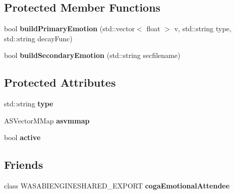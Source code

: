 \subsection*{\-Protected \-Member \-Functions}
\begin{DoxyCompactItemize}
\item 
\hypertarget{class_emotion_container_ae4ab08ca4de2ee7cbbdd6178e38dc560}{
bool {\bfseries build\-Primary\-Emotion} (std\-::vector$<$ float $>$ v, std\-::string type, std\-::string decay\-Func)}
\label{class_emotion_container_ae4ab08ca4de2ee7cbbdd6178e38dc560}

\item 
\hypertarget{class_emotion_container_aa280b192728fd4ab900fd6ce8792a995}{
bool {\bfseries build\-Secondary\-Emotion} (std\-::string secfilename)}
\label{class_emotion_container_aa280b192728fd4ab900fd6ce8792a995}

\end{DoxyCompactItemize}
\subsection*{\-Protected \-Attributes}
\begin{DoxyCompactItemize}
\item 
\hypertarget{class_emotion_container_a55a74daa41036de8653c9d9c92894544}{
std\-::string {\bfseries type}}
\label{class_emotion_container_a55a74daa41036de8653c9d9c92894544}

\item 
\hypertarget{class_emotion_container_a710ccc1213bd8ee3dd9cc79efa6a129d}{
\-A\-S\-Vector\-M\-Map {\bfseries asvmmap}}
\label{class_emotion_container_a710ccc1213bd8ee3dd9cc79efa6a129d}

\item 
\hypertarget{class_emotion_container_a35dc16eeb7df5034d5a84e151ecf7edf}{
bool {\bfseries active}}
\label{class_emotion_container_a35dc16eeb7df5034d5a84e151ecf7edf}

\end{DoxyCompactItemize}
\subsection*{\-Friends}
\begin{DoxyCompactItemize}
\item 
\hypertarget{class_emotion_container_abcef228967f40c7b02f677e5fa9272fa}{
class \-W\-A\-S\-A\-B\-I\-E\-N\-G\-I\-N\-E\-S\-H\-A\-R\-E\-D\-\_\-\-E\-X\-P\-O\-R\-T {\bfseries coga\-Emotional\-Attendee}}
\label{class_emotion_container_abcef228967f40c7b02f677e5fa9272fa}

\end{DoxyCompactItemize}


